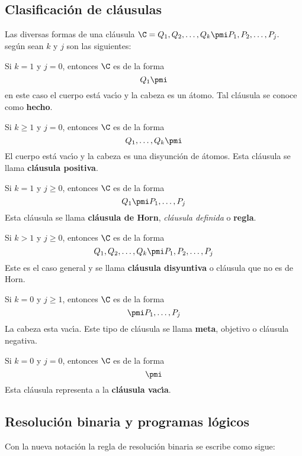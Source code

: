 \documentclass[11pt,letterpaper]{article}
\begin{document}
\subsection{Clasificaci\'on de cl\'ausulas}

\noindent Las diversas formas de una cl\'ausula 
$ \C=Q_1,Q_2,\ldots, Q_k \pmi P_1, P_2,\ldots, P_j.$ seg\'un sean $k$ y 
$j$ son las siguientes:
\be
 \item Si $k=1$ y $j=0$, entonces $\C$ es de la forma $$Q_1\pmi $$ 
  en este caso el cuerpo est\'a vac\'{\i}o y la cabeza es un \'atomo. 
  Tal cl\'ausula se conoce como \textbf{hecho}.
 \item Si $k\geq 1$ y $j=0$, entonces $\C$ es de la forma 
  $$ Q_1,\ldots,Q_k\pmi  $$
  El cuerpo est\'a vac\'{\i}o y la cabeza es una disyunci\'on de \'atomos. 
  Esta cl\'ausula se llama \textbf{cl\'ausula positiva}.
 \item Si $k=1$ y $j\geq 0$, entonces  $\C$ es de la forma
  $$ Q_1\pmi P_1,\ldots,P_j $$ 
  Esta cl\'ausula se llama \textbf{cl\'ausula de Horn}, 
  \emph{cl\'ausula definida} o \textbf{regla}.
 \item Si $k > 1$ y $j\geq 0$, entonces $\C$ es de la forma 
  $$ Q_1,Q_2,\ldots, Q_k \pmi P_1, P_2,\ldots, P_j $$
  Este es el caso general y se llama \textbf{cl\'ausula disyuntiva} o 
  cl\'ausula que no es de Horn.
 \item Si $k=0$ y $j\geq 1$, entonces $\C$ es de la forma
  $$ \pmi P_1,\ldots,P_j $$
  La cabeza esta vac\'{\i}a. Este tipo de cl\'ausula se llama \textbf{meta},
  objetivo o cl\'ausula negativa.
 \item Si $k=0$ y $j=0$, entonces $\C$ es de la forma 
  $$ \pmi $$
  Esta cl\'ausula representa a la \textbf{cl\'ausula vac\'{\i}a}.
\ee


\subsection{Resoluci\'on binaria y programas l\'ogicos}

Con la nueva notaci\'on la regla de resoluci\'on binaria se escribe como sigue:
\begin{mathpar}
\end{mathpar}
 
\end{document}
